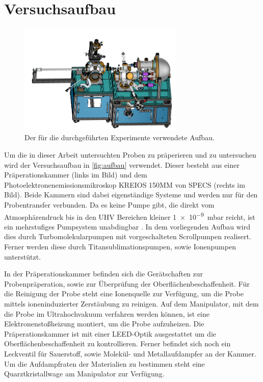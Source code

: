     \section{Versuchsaufbau}
    \label{sec:Versuchsaufbau}
        \begin{figure}
            \centering
            \includegraphics[width=0.7\textwidth]{MM.png}
            \caption{Der für die durchgeführten Experimente verwendete Aufbau.}
            \label{fig:aufbau}
        \end{figure}
        Um die in dieser Arbeit untersuchten Proben zu präperieren und zu untersuchen wird der Versuchsaufbau in \autoref{fig:aufbau} verwendet.
        Dieser besteht aus einer Präperationskammer (links im Bild) und dem Photoelektronenemissionsmikroskop KREIOS 150MM von SPECS (rechts im Bild).
        Beide Kammern sind dabei eigenständige Systeme und werden nur für den Probentransfer verbunden.
        Da es keine Pumpe gibt, die direkt vom Atmosphärendruck bis in den UHV Bereichen kleiner \SI{1e-9}{\milli\bar} reicht, ist ein mehrstufiges Pumpsystem unabdingbar \cite{Henzler}.
        In dem vorliegenden Aufbau wird dies durch Turbomolekularpumpen mit vorgeschalteten Scrollpumpen realisert.
        Ferner werden diese durch Titansublimationspumpen, sowie Ionenpumpen unterstützt.

        In der Präperationskammer befinden sich die Gerätschaften zur Probenpräperation, sowie zur Überprüfung der Oberflächenbeschaffenheit.
        Für die Reinigung der Probe steht eine Ionenquelle zur Verfügung, um die Probe mittels ioneninduzierter Zerstäubung zu reinigen.
        Auf dem Manipulator, mit dem die Probe im Ultrahochvakuum verfahren werden können, ist eine Elektronenstoßheizung montiert, um die Probe aufzuheizen.
        Die Präperationskammer ist mit einer LEED-Optik ausgestattet um die Oberflächenbeschaffenheit zu kontrollieren.
        Ferner befindet sich noch ein Leckventil für Sauerstoff, sowie Molekül- und Metallaufdampfer an der Kammer.
        Um die Aufdampfraten der Materialien zu bestimmen steht eine Quarztkristallwage am Manipulator zur Verfügung.

